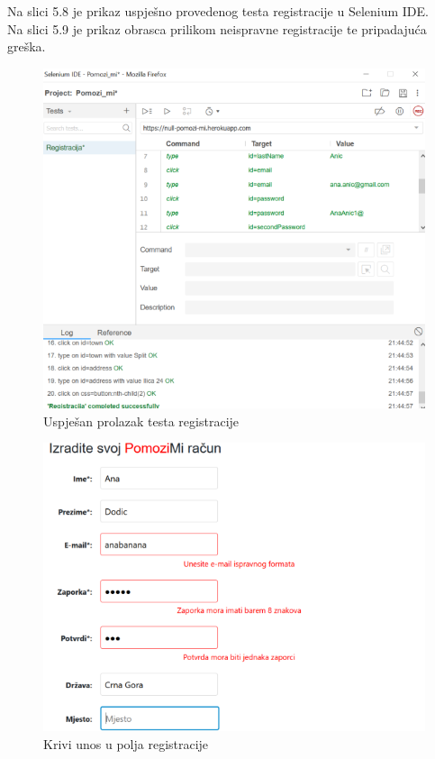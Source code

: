         \noindent \text 
        Na slici 5.8 je prikaz uspješno provedenog testa registracije u Selenium IDE.\\
        \noindent \text 
        Na slici 5.9 je prikaz obrasca prilikom neispravne registracije te pripadajuća greška.\\
		\begin{figure}[H]
                 \includegraphics[width=\textwidth, height=\textheight, keepaspectratio]{slike/registracija.png}
                \centering
                \caption{Uspješan prolazak testa registracije}
        \end{figure}
		\begin{figure}[H]
                 \includegraphics[width=\textwidth, height=\textheight, keepaspectratio]{slike/kriva_reg.png}
                \centering
                \caption{Krivi unos u polja registracije}
        \end{figure}
		
